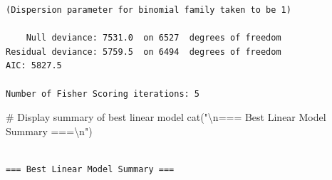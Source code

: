 \documentclass[
  11pt]{article}
\newenvironment{Shaded}{\begin{snugshade}}{\end{snugshade}}
\newcommand{\CommentTok}[1]{\textcolor[rgb]{0.37,0.37,0.37}{#1}}
\newcommand{\FunctionTok}[1]{\textcolor[rgb]{0.28,0.35,0.67}{#1}}
\newcommand{\NormalTok}[1]{\textcolor[rgb]{0.00,0.23,0.31}{#1}}
\newcommand{\SpecialCharTok}[1]{\textcolor[rgb]{0.37,0.37,0.37}{#1}}
\newcommand{\StringTok}[1]{\textcolor[rgb]{0.13,0.47,0.30}{#1}}
\begin{document}
\begin{verbatim}
(Dispersion parameter for binomial family taken to be 1)

    Null deviance: 7531.0  on 6527  degrees of freedom
Residual deviance: 5759.5  on 6494  degrees of freedom
AIC: 5827.5

Number of Fisher Scoring iterations: 5
\end{verbatim}

\begin{Shaded}
\begin{Highlighting}[]
\CommentTok{\# Display summary of best linear model}
\FunctionTok{cat}\NormalTok{(}\StringTok{"}\SpecialCharTok{\textbackslash{}n}\StringTok{=== Best Linear Model Summary ===}\SpecialCharTok{\textbackslash{}n}\StringTok{"}\NormalTok{)}
\end{Highlighting}
\end{Shaded}

\begin{verbatim}

=== Best Linear Model Summary ===
\end{verbatim}

\begin{Shaded}
\end{Shaded}
\end{document}
